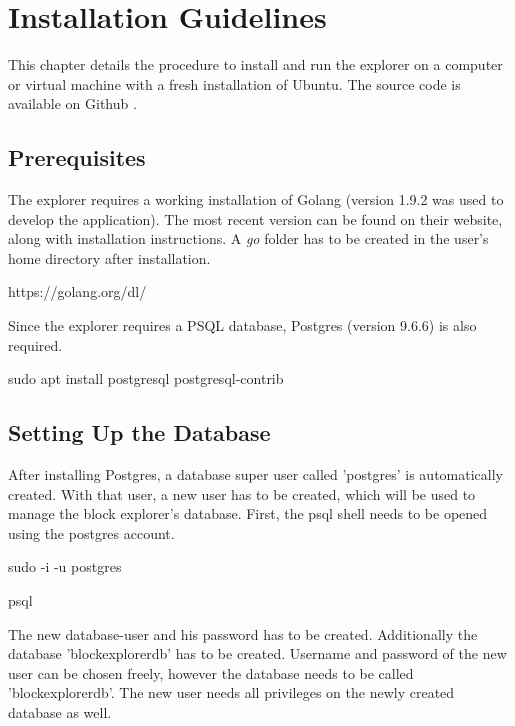 \appendix

\chapter{Installation Guidelines}
This chapter details the procedure to install and run the explorer on a computer or virtual machine with a fresh installation of Ubuntu. The source code is available on Github \cite{explorer}.

\section{Prerequisites}
The explorer requires a working installation of Golang (version 1.9.2 was used to develop the application). The most recent version can be found on their website, along with installation instructions. A \emph{go} folder has to be created in the user's home directory after installation.

\begin{framed}
https://golang.org/dl/
\end{framed}

%
%
Since the explorer requires a PSQL database, Postgres (version 9.6.6) is also required.

\begin{framed}
sudo apt install postgresql postgresql-contrib
\end{framed}

\section{Setting Up the Database}

After installing Postgres, a database super user called 'postgres' is automatically created. With that user, a new user has to be created, which will be used to manage the block explorer's database. First, the psql shell needs to be opened using the postgres account.

\begin{framed}
sudo -i -u postgres

psql
\end{framed}
The new database-user and his password has to be created. Additionally the database 'blockexplorerdb' has to be created. Username and password of the new user can be chosen freely, however the database needs to be called 'blockexplorerdb'. The new user needs all privileges on the newly created database as well.


